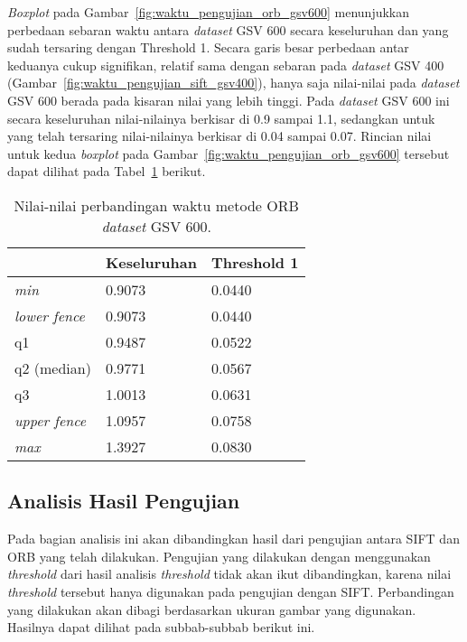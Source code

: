 \textit{Boxplot} pada Gambar~\ref{fig:waktu_pengujian_orb_gsv600} menunjukkan perbedaan sebaran waktu antara \textit{dataset} GSV 600 secara keseluruhan dan yang sudah tersaring dengan Threshold 1. Secara garis besar perbedaan antar keduanya cukup signifikan, relatif sama dengan sebaran pada \textit{dataset} GSV 400 (Gambar~\ref{fig:waktu_pengujian_sift_gsv400}), hanya saja nilai-nilai pada \textit{dataset} GSV 600 berada pada kisaran nilai yang lebih tinggi. Pada \textit{dataset} GSV 600 ini secara keseluruhan nilai-nilainya berkisar di 0.9 sampai 1.1, sedangkan untuk yang telah tersaring nilai-nilainya berkisar di 0.04 sampai 0.07. Rincian nilai untuk kedua \textit{boxplot} pada Gambar~\ref{fig:waktu_pengujian_orb_gsv600} tersebut dapat dilihat pada Tabel~\ref{tab:boxplot_gsv600_orb} berikut.
\begin{table}[H]
	\centering
	\begin{tabular}{|l|l|l|}
		\hline
		& \textbf{Keseluruhan} & \textbf{Threshold 1}         \\ \hline
		\textit{min}          & 0.9073 & 0.0440               \\ \hline
		\textit{lower fence}  & 0.9073 & 0.0440               \\ \hline
		q1                    & 0.9487 & 0.0522               \\ \hline
		q2 (median)           & 0.9771 & 0.0567               \\ \hline
		q3                    & 1.0013 & 0.0631               \\ \hline
		\textit{upper fence}  & 1.0957 & 0.0758               \\ \hline
		\textit{max}          & 1.3927 & 0.0830               \\ \hline
	\end{tabular}
	\caption{Nilai-nilai perbandingan waktu metode ORB \textit{dataset} GSV 600.}
	\label{tab:boxplot_gsv600_orb}
\end{table}

\subsection{Analisis Hasil Pengujian}
Pada bagian analisis ini akan dibandingkan hasil dari pengujian antara SIFT dan ORB yang telah dilakukan. Pengujian yang dilakukan dengan menggunakan \textit{threshold} dari hasil analisis \textit{threshold} tidak akan ikut dibandingkan, karena nilai \textit{threshold} tersebut hanya digunakan pada pengujian dengan SIFT. Perbandingan yang dilakukan akan dibagi berdasarkan ukuran gambar yang digunakan. Hasilnya dapat dilihat pada subbab-subbab berikut ini.


